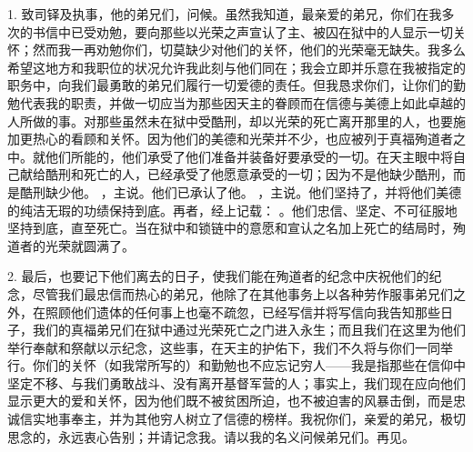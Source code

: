 1. 致司铎及执事，他的弟兄们，问候。虽然我知道，最亲爱的弟兄，你们在我多次的书信中已受劝勉，要向那些以光荣之声宣认了主、被囚在狱中的人显示一切关怀；然而我一再劝勉你们，切莫缺少对他们的关怀，他们的光荣毫无缺失。我多么希望这地方和我职位的状况允许我此刻与他们同在；我会立即并乐意在我被指定的职务中，向我们最勇敢的弟兄们履行一切爱德的责任。但我恳求你们，让你们的勤勉代表我的职责，并做一切应当为那些因天主的眷顾而在信德与美德上如此卓越的人所做的事。对那些虽然未在狱中受酷刑，却以光荣的死亡离开那里的人，也要施加更热心的看顾和关怀。因为他们的美德和光荣并不少，也应被列于真福殉道者之中。就他们所能的，他们承受了他们准备并装备好要承受的一切。在天主眼中将自己献给酷刑和死亡的人，已经承受了他愿意承受的一切；因为不是他缺少酷刑，而是酷刑缺少他。 ，主说。他们已承认了他。 ，主说。他们坚持了，并将他们美德的纯洁无瑕的功绩保持到底。再者，经上记载： 。他们忠信、坚定、不可征服地坚持到底，直至死亡。当在狱中和锁链中的意愿和宣认之名加上死亡的结局时，殉道者的光荣就圆满了。\par

2. 最后，也要记下他们离去的日子，使我们能在殉道者的纪念中庆祝他们的纪念，尽管我们最忠信而热心的弟兄，他除了在其他事务上以各种劳作服事弟兄们之外，在照顾他们遗体的任何事上也毫不疏忽，已经写信并将写信向我告知那些日子，我们的真福弟兄们在狱中通过光荣死亡之门进入永生；而且我们在这里为他们举行奉献和祭献以示纪念，这些事，在天主的护佑下，我们不久将与你们一同举行。你们的关怀（如我常所写的）和勤勉也不应忘记穷人——我是指那些在信仰中坚定不移、与我们勇敢战斗、没有离开基督军营的人；事实上，我们现在应向他们显示更大的爱和关怀，因为他们既不被贫困所迫，也不被迫害的风暴击倒，而是忠诚信实地事奉主，并为其他穷人树立了信德的榜样。我祝你们，亲爱的弟兄，极切思念的，永远衷心告别；并请记念我。请以我的名义问候弟兄们。再见。\par



\section{}

